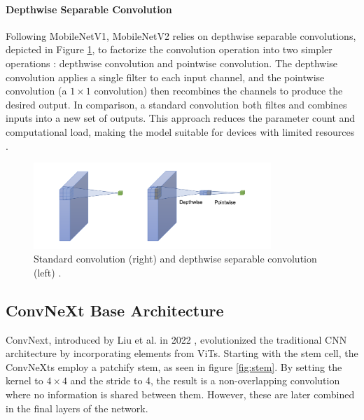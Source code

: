 \paragraph{Depthwise Separable Convolution}
Following MobileNetV1, MobileNetV2 relies on depthwise separable convolutions, depicted in Figure \ref{fig:depthwise_sep_conv}, to factorize the convolution operation into two simpler operations \cite{howard2017mobilenetsefficientconvolutionalneural}: depthwise convolution and pointwise convolution. The depthwise convolution applies a single filter to each input channel, and the pointwise convolution (a $1\times 1$ convolution) then recombines the channels to produce the desired output. In comparison, a standard convolution both filtes and combines inputs into a new set of outputs. This approach reduces the parameter count and computational load, making the model suitable for devices with limited resources \cite{howard2017mobilenetsefficientconvolutionalneural,sandler2018mobilenetv2}.

\begin{figure}[ht]
    \centering
    \includegraphics[width=0.8\textwidth]{Images/depthwise_separable_conv.png} 
    \caption{Standard convolution (right) and depthwise separable convolution (left) \cite{guo2019depthwiseconvolutionneedlearning}.}
    \label{fig:depthwise_sep_conv}
\end{figure}





\subsection{ConvNeXt Base Architecture}
\label{sec:convnext}
ConvNext, introduced by Liu et al. in 2022 \cite{liu2022convnet2020s}, evolutionized the traditional CNN architecture by incorporating elements from ViTs. Starting with the stem cell, the ConvNeXts employ a patchify stem, as seen in figure \ref{fig:stem}. By setting the kernel to $4 \times 4$ and the stride to 4, the result is a non-overlapping convolution where no information is shared between them. However, these are later combined in the final layers of the network.  

